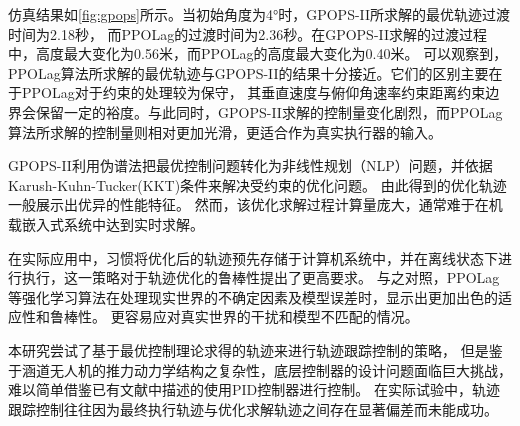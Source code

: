 仿真结果如\autoref{fig:gpops}所示。当初始角度为4°时，GPOPS-II所求解的最优轨迹过渡时间为2.18秒，
而PPOLag的过渡时间为2.36秒。在GPOPS-II求解的过渡过程中，高度最大变化为0.56米，而PPOLag的高度最大变化为0.40米。
可以观察到，PPOLag算法所求解的最优轨迹与GPOPS-II的结果十分接近。它们的区别主要在于PPOLag对于约束的处理较为保守，
其垂直速度与俯仰角速率约束距离约束边界会保留一定的裕度。与此同时，GPOPS-II求解的控制量变化剧烈，而PPOLag算法所求解的控制量则相对更加光滑，更适合作为真实执行器的输入。



GPOPS-II利用伪谱法把最优控制问题转化为非线性规划（NLP）问题，并依据Karush-Kuhn-Tucker(KKT)条件来解决受约束的优化问题。
由此得到的优化轨迹一般展示出优异的性能特征。
然而，该优化求解过程计算量庞大，通常难于在机载嵌入式系统中达到实时求解。

在实际应用中，习惯将优化后的轨迹预先存储于计算机系统中，并在离线状态下进行执行，这一策略对于轨迹优化的鲁棒性提出了更高要求。
与之对照，PPOLag等强化学习算法在处理现实世界的不确定因素及模型误差时，显示出更加出色的适应性和鲁棒性。
更容易应对真实世界的干扰和模型不匹配的情况。

本研究尝试了基于最优控制理论求得的轨迹来进行轨迹跟踪控制的策略，
但是鉴于涵道无人机的推力动力学结构之复杂性，底层控制器的设计问题面临巨大挑战，
难以简单借鉴已有文献\cite{verling2017model}中描述的使用PID控制器进行控制。
在实际试验中，轨迹跟踪控制往往因为最终执行轨迹与优化求解轨迹之间存在显著偏差而未能成功。

